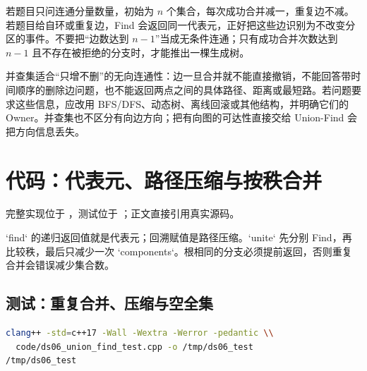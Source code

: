 \documentclass[UTF8,fontset=none,11pt,a4paper]{ctexart}
\begin{document}
若题目只问连通分量数量，初始为 $n$ 个集合，每次成功合并减一，重复边不减。若题目给自环或重复边，Find 会返回同一代表元，正好把这些边识别为不改变分区的事件。不要把“边数达到 $n-1$”当成无条件连通；只有成功合并次数达到 $n-1$ 且不存在被拒绝的分支时，才能推出一棵生成树。

并查集适合“只增不删”的无向连通性：边一旦合并就不能直接撤销，不能回答带时间顺序的删除边问题，也不能返回两点之间的具体路径、距离或最短路。若问题要求这些信息，应改用 BFS/DFS、动态树、离线回滚或其他结构，并明确它们的 Owner。并查集也不区分有向边方向；把有向图的可达性直接交给 Union-Find 会把方向信息丢失。

\section{代码：代表元、路径压缩与按秩合并}
完整实现位于 ，测试位于 ；正文直接引用真实源码。

`find` 的递归返回值就是代表元；回溯赋值是路径压缩。`unite` 先分别 Find，再比较秩，最后只减少一次 `components`。根相同的分支必须提前返回，否则重复合并会错误减少集合数。


\subsection{测试：重复合并、压缩与空全集}

\begin{lstlisting}[language=bash]
clang++ -std=c++17 -Wall -Wextra -Werror -pedantic \\
  code/ds06_union_find_test.cpp -o /tmp/ds06_test
/tmp/ds06_test
\end{lstlisting}
\end{document}
